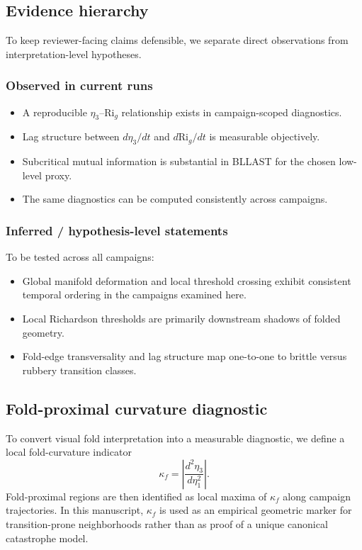 \documentclass[12pt,a4paper]{article}
\newcommand{\Rig}{\mathrm{Ri}_g}
\begin{document}
\subsection{Evidence hierarchy}

To keep reviewer-facing claims defensible, we separate direct observations from interpretation-level hypotheses.

\subsubsection{Observed in current runs}

\begin{itemize}
  \item A reproducible $\eta_3$--$\Rig$ relationship exists in campaign-scoped diagnostics.
  \item Lag structure between $d\eta_3/dt$ and $d\Rig/dt$ is measurable objectively.
  \item Subcritical mutual information is substantial in BLLAST for the chosen low-level proxy.
  \item The same diagnostics can be computed consistently across campaigns.
\end{itemize}

\subsubsection{Inferred / hypothesis-level statements}

To be tested across all campaigns:
\begin{itemize}
  \item Global manifold deformation and local threshold crossing exhibit consistent temporal ordering in the campaigns examined here.
  \item Local Richardson thresholds are primarily downstream shadows of folded geometry.
  \item Fold-edge transversality and lag structure map one-to-one to brittle versus rubbery transition classes.
\end{itemize}

\subsection{Fold-proximal curvature diagnostic}

To convert visual fold interpretation into a measurable diagnostic, we define a local fold-curvature indicator
\begin{equation}
\kappa_f = \left|\frac{d^2\eta_3}{d\eta_1^2}\right|.
\end{equation}
Fold-proximal regions are then identified as local maxima of $\kappa_f$ along campaign trajectories. In this manuscript, $\kappa_f$ is used as an empirical geometric marker for transition-prone neighborhoods rather than as proof of a unique canonical catastrophe model.
\end{document}
